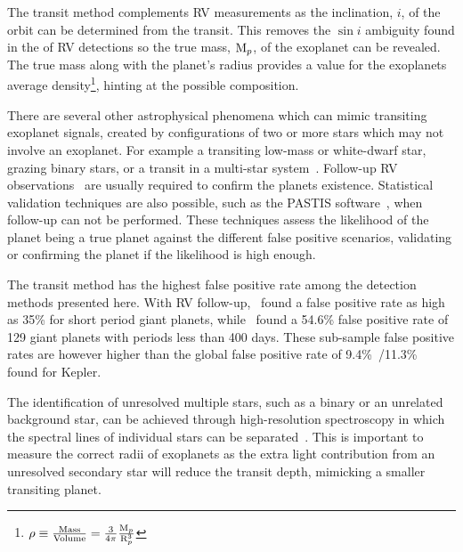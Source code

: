 The transit method complements {RV} measurements as the inclination, \(i\), of the orbit can be determined from the transit.
This removes the {$\sin{i}$} ambiguity found in the \Mpsini{} of {RV} detections so the true mass, \(\textrm{M}_{p}\), of the exoplanet can be revealed.
The true mass along with the planet's radius provides a value for the exoplanets average density\footnote{$\rho \equiv \frac{\textrm{Mass}}{\textrm{Volume}} = \frac{3}{4\pi}\frac{\textrm{M}_{p}}{\textrm{R}_{p}^{3}}$}, hinting at the possible composition.

There are several other astrophysical phenomena which can mimic transiting exoplanet signals, created by configurations of two or more stars which may not involve an exoplanet.
For example a transiting low-mass or white-dwarf star, grazing binary stars, or a transit in a multi-star system~\citep[see e.g.][]{cameron_extrasolar_2012, santerne_contribution_2013}.
Follow-up {RV} observations~\citep[e.g.][]{santerne_radial_2011} are usually required to confirm the planets existence.
Statistical validation techniques are also possible, such as the PASTIS software~\citep{diaz_pastis_2014}, when follow-up can not be performed.
These techniques assess the likelihood of the planet being a true planet against the different false positive scenarios, validating or confirming the planet if the likelihood is high enough.

The transit method has the highest false positive rate among the detection methods presented here.
With {RV} follow-up,~\citet{santerne_sophie_2012} found a false positive rate as high as 35\% for short period giant planets, while~\citet{santerne_sophie_2016} found a 54.6\% false positive rate of 129 giant planets with periods less than 400 days.
These sub-sample false positive rates are however higher than the global false positive rate of 9.4\%~\citep{fressin_false_2013}/11.3\%~\citep{santerne_contribution_2013} found for Kepler.


The identification of unresolved multiple stars, such as a binary or an unrelated background star, can be achieved through high-resolution spectroscopy in which the spectral lines of individual stars can be separated~\citep{kolbl_detection_2015}.
This is important to measure the correct radii of exoplanets as the extra light contribution from an unresolved secondary star will reduce the transit depth, mimicking a smaller transiting planet.

